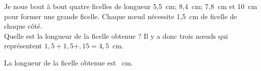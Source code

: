 Je noue bout à bout quatre ficelles de longueur 5,5~cm; 8,4~cm;
7,8~cm et 10~cm pour former une grande ficelle. Chaque n\oe ud
nécessite 1,5~cm de ficelle de chaque côté.\\Quelle est la
longueur de la ficelle obtenue ?
Il y a donc trois n\oe uds qui représentent $1,5+1,5+,15=4,5$~cm.
\par
{}\kern1cm\kern1cm\kern1cm\par
La longueur de la ficelle obtenue est ~cm.
